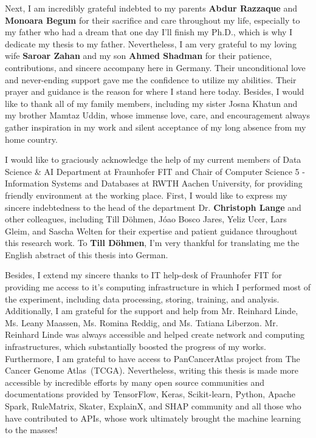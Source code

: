 \begin{acknowledgements}
    \hspace*{5mm} Next, I am incredibly grateful indebted to my parents \textbf{Abdur Razzaque} and \textbf{Monoara Begum} for their sacrifice and care throughout my life, especially to my father who had a dream that one day I'll finish my Ph.D., which is why I dedicate my thesis to my father. Nevertheless, I am very grateful to my loving wife \textbf{Saroar Zahan} and my son \textbf{Ahmed Shadman} for their patience, contributions, and sincere accompany here in Germany. Their unconditional love and never-ending support gave me the confidence to utilize my abilities. Their prayer and guidance is the reason for where I stand here today. Besides, I would like to thank all of my family members, including my sister Josna Khatun and my brother Mamtaz Uddin, whose immense love, care, and encouragement always gather inspiration in my work and silent acceptance of my long absence from my home country. 
    
    \hspace*{5mm} I would like to graciously acknowledge the help of my current members of Data Science \& AI Department at Fraunhofer FIT and Chair of Computer Science 5 - Information Systems and Databases at RWTH Aachen University, for providing friendly environment at the working place. First, I would like to express my sincere indebtedness to the head of the department Dr. \textbf{Christoph Lange} and other colleagues, including Till D{\"o}hmen, J{\'o}ao Bosco Jares, Yeliz Ucer, Lars Gleim, and Sascha Welten for their expertise and patient guidance throughout this research work. To \textbf{Till D{\"o}hmen}, I'm very thankful for translating me the English abstract of this thesis into German. 
    
    \hspace*{5mm} Besides, I extend my sincere thanks to IT help-desk of Fraunhofer FIT for providing me access to it's computing infrastructure in which I performed most of the experiment, including data processing, storing, training, and analysis. Additionally, I am grateful for the support and help from Mr. Reinhard Linde, Ms. Leany Maassen, Ms. Romina Reddig, and Ms. Tatiana Liberzon. Mr. Reinhard Linde was always accessible and helped create network and computing infrastructures, which substantially boosted the progress of my works. Furthermore, I am grateful to have access to PanCancerAtlas project from The Cancer Genome Atlas~(TCGA). Nevertheless, writing this thesis is made more accessible by incredible efforts by many open source communities and documentations provided by TensorFlow, Keras, Scikit-learn, Python, Apache Spark, RuleMatrix, Skater, ExplainX, and SHAP community and all those who have contributed to APIs, whose work ultimately brought the machine learning to the masses! 
    

\end{acknowledgements}
